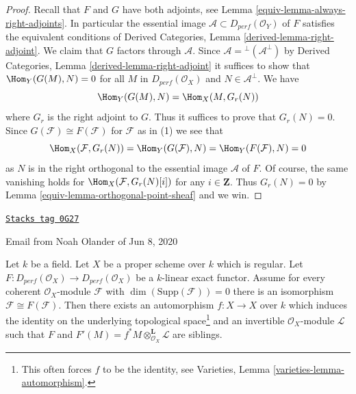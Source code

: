 \begin{proof}

Recall that $F$ and $G$ have both adjoints, see
Lemma \ref{equiv-lemma-always-right-adjoints}. In particular
the essential image $\mathcal{A} \subset D_{perf}(\mathcal{O}_Y)$ of $F$
satisfies the equivalent conditions of
Derived Categories, Lemma \ref{derived-lemma-right-adjoint}.
We claim that $G$ factors through $\mathcal{A}$.
Since $\mathcal{A} = {}^\perp(\mathcal{A}^\perp)$ by
Derived Categories, Lemma \ref{derived-lemma-right-adjoint}
it suffices to show that $\Hom_Y(G(M), N) = 0$ for
all $M$ in $D_{perf}(\mathcal{O}_X)$ and $N \in \mathcal{A}^\perp$.
We have
$$
\Hom_Y(G(M), N) = \Hom_X(M, G_r(N))
$$
where $G_r$ is the right adjoint to $G$. Thus it suffices to prove
that $G_r(N) = 0$. Since
$G(\mathcal{F}) \cong F(\mathcal{F})$ for $\mathcal{F}$ as in (1)
we see that
$$
\Hom_X(\mathcal{F}, G_r(N)) =
\Hom_Y(G(\mathcal{F}), N) =
\Hom_Y(F(\mathcal{F}), N) = 0
$$
as $N$ is in the right orthogonal to the essential image $\mathcal{A}$ of $F$.
Of course, the same vanishing holds for $\Hom_X(\mathcal{F}, G_r(N)[i])$
for any $i \in \mathbf{Z}$. Thus $G_r(N) = 0$ by
Lemma \ref{equiv-lemma-orthogonal-point-sheaf} and we win.
\end{proof}

\begin{lemma}[Noah]
\label{equiv-lemma-noah}
\href{https://stacks.math.columbia.edu/tag/0G27}{\texttt{Stacks tag 0G27}}

\begin{reference}
Email from Noah Olander of Jun 8, 2020
\end{reference}
Let $k$ be a field. Let $X$ be a proper scheme over $k$ which is regular.
Let $F : D_{perf}(\mathcal{O}_X) \to D_{perf}(\mathcal{O}_X)$
be a $k$-linear exact functor. Assume for every coherent
$\mathcal{O}_X$-module $\mathcal{F}$ with $\dim(\text{Supp}(\mathcal{F})) = 0$
there is an isomorphism $\mathcal{F} \cong F(\mathcal{F})$.
Then there exists an automorphism $f : X \to X$ over $k$
which induces the identity on the
underlying topological space\footnote{This often forces $f$
to be the identity, see Varieties, Lemma \ref{varieties-lemma-automorphism}.}
and an invertible $\mathcal{O}_X$-module $\mathcal{L}$
such that $F$ and $F'(M) = f^*M \otimes_{\mathcal{O}_X}^\mathbf{L} \mathcal{L}$
are siblings.
\end{lemma}

